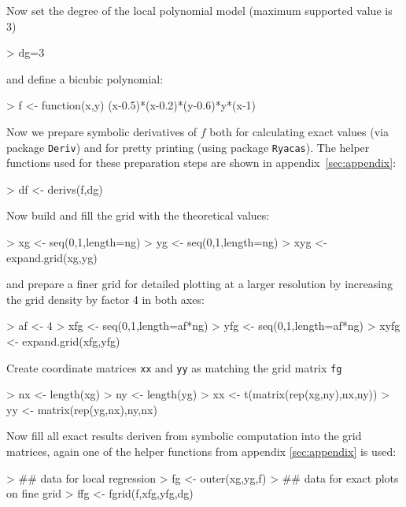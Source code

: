 \documentclass[nojss]{jss}
\begin{document}
Now set the degree of the local polynomial model (maximum supported
value is 3)
\begin{Schunk}
\begin{Sinput}
> dg=3
\end{Sinput}
\end{Schunk}
and define a bicubic polynomial:
\begin{Schunk}
\begin{Sinput}
> f <- function(x,y) (x-0.5)*(x-0.2)*(y-0.6)*y*(x-1)
\end{Sinput}
\end{Schunk}
Now we prepare symbolic derivatives of $f$ both for calculating exact
values (via package \texttt{Deriv}) and for pretty printing (using
package \texttt{Ryacas}). The helper functions used for these
preparation steps are shown in appendix~\ref{sec:appendix}:
\begin{Schunk}
\begin{Sinput}
> df <- derivs(f,dg)
\end{Sinput}
\end{Schunk}
Now build and fill the grid with the theoretical values:
\begin{Schunk}
\begin{Sinput}
> xg <- seq(0,1,length=ng)
> yg <- seq(0,1,length=ng)
> xyg <- expand.grid(xg,yg)
\end{Sinput}
\end{Schunk}
and prepare a finer grid for detailed plotting at a larger
resolution by increasing the grid density by factor 4 in both axes:
\begin{Schunk}
\begin{Sinput}
> af <- 4
> xfg <- seq(0,1,length=af*ng)
> yfg <- seq(0,1,length=af*ng)
> xyfg <- expand.grid(xfg,yfg)
\end{Sinput}
\end{Schunk}
Create coordinate matrices \texttt{xx} and \texttt{yy} as  matching the grid matrix \texttt{fg}
\begin{Schunk}
\begin{Sinput}
> nx <- length(xg)
> ny <- length(yg)
> xx <- t(matrix(rep(xg,ny),nx,ny))
> yy <- matrix(rep(yg,nx),ny,nx)
\end{Sinput}
\end{Schunk}
Now fill all exact results deriven from symbolic computation into the
grid matrices, again one of the helper functions from appendix
\ref{sec:appendix} is used:
\begin{Schunk}
\begin{Sinput}
> ## data for local regression
> fg   <- outer(xg,yg,f)
> ## data for exact plots on fine grid
> ffg <- fgrid(f,xfg,yfg,dg)
\end{Sinput}
\end{Schunk}
\end{document}
